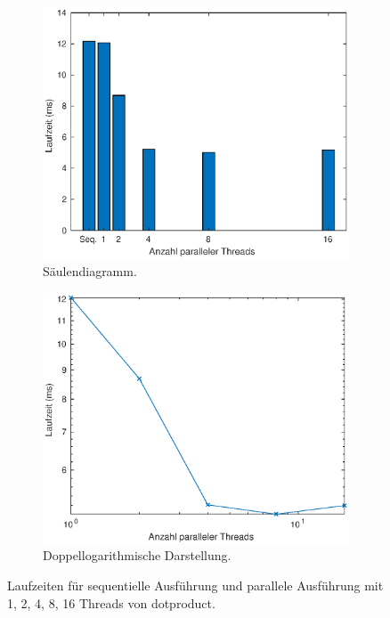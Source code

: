 \begin{figure}[htbp]
 \centering 
 \begin{subfigure}{.49\textwidth}
  \centering 
  \includegraphics[width=1\textwidth]{img/aufgabe3_barplot.eps}
  \caption{Säulendiagramm.}
  \label{fig:aufgabe3_barplot}
 \end{subfigure}
%
 \begin{subfigure}{.49\textwidth}
  \centering 
  \includegraphics[width=1\textwidth]{img/aufgabe3_logplot.eps}
  \caption{Doppellogarithmische Darstellung.}
  \label{fig:aufgabe3_logplot}
 \end{subfigure}
\caption{Laufzeiten für sequentielle Ausführung und parallele Ausführung mit 1, 2, 4, 8, 16 Threads von dotproduct.}
\label{fig:aufgabe3}
\end{figure}

